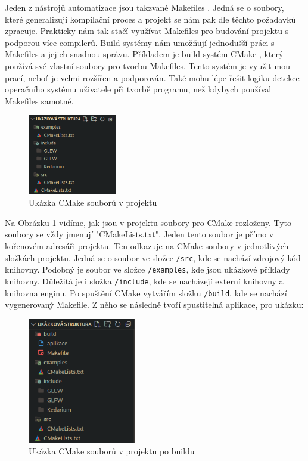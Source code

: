 \documentclass[12pt]{article}
\begin{document}
Jeden z nástrojů automatizace jsou takzvané Makefiles \cite{makefile}. Jedná se o soubory, které generalizují kompilační proces a projekt se nám pak dle těchto požadavků zpracuje. Prakticky nám tak stačí využívat Makefiles pro budování projektu s podporou více compilerů. Build systémy nám umožňují jednodušší práci s Makefiles a jejich snadnou správu. Příkladem je build systém CMake \cite{cmake}, který používá své vlastní soubory pro tvorbu Makefiles. Tento systém je využit mou prací, neboť je velmi rozšířen a podporován. Také mohu lépe řešit logiku detekce operačního systému uživatele při tvorbě programu, než kdybych používal Makefiles samotné.

\vspace{0.5cm}
\begin{figure}[h]
    \centering
    \includegraphics[height=3.5cm]{images/fs.png}
    \caption{Ukázka CMake souborů v projektu}
    \label{fig:Ukázka CMake souborů v projektu}
\end{figure}

\pagebreak

Na Obrázku \ref{fig:Ukázka CMake souborů v projektu} vidíme, jak jsou v projektu soubory pro CMake rozloženy. Tyto soubory se vždy jmenují "CMakeLists.txt". Jeden tento soubor je přímo v kořenovém adresáři projektu. Ten odkazuje na CMake soubory v jednotlivých složkách projektu. Jedná se o soubor ve složce \texttt{/src}, kde se nachází zdrojový kód knihovny. Podobný je soubor ve složce \texttt{/examples}, kde jsou ukázkové příklady knihovny. Důležitá je i složka \texttt{/include}, kde se nacházejí externí knihovny a knihovna enginu. Po spuštění CMake vytvářím složku \texttt{/build}, kde se nachází vygenerovaný Makefile. Z něho se následně tvoří spustitelná aplikace, pro ukázku:

\vspace{0.5cm}
\begin{figure}[h]
    \centering
    \includegraphics[height=5.5cm]{images/fs_2.png}
    \caption{Ukázka CMake souborů v projektu po buildu}
    \label{fig:Ukázka CMake souborů v projektu po buildu}
\end{figure}
\end{document}
